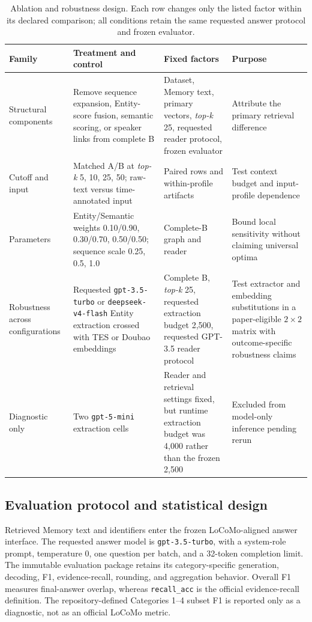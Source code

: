 \documentclass[10pt,twocolumn]{article}
\newcommand{\recallacc}{\texttt{recall\_acc}}
\newcommand{\topk}{\textit{top-k}}
\begin{document}
\begin{table}[!t]
\centering
\caption*{Ablation and robustness design. Each row changes only the listed
factor within its declared comparison; all conditions retain the same
requested answer protocol and frozen evaluator.}
\begin{tabularx}{\textwidth}{@{}p{}p{}Xp{}@{}}
\toprule
Family & Treatment and control & Fixed factors & Purpose \\
\midrule
Structural components & Remove sequence expansion, Entity-score fusion,
semantic scoring, or speaker links from complete B & Dataset, Memory text,
primary vectors, \topk{} 25, requested reader protocol, frozen evaluator & Attribute the primary
retrieval difference \\
Cutoff and input & Matched A/B at \topk{} 5, 10, 25, 50; raw-text versus
time-annotated input & Paired rows and within-profile artifacts & Test context
budget and input-profile dependence \\
Parameters & Entity/Semantic weights 0.10/0.90, 0.30/0.70, 0.50/0.50;
sequence scale 0.25, 0.5, 1.0 & Complete-B graph and reader & Bound local
sensitivity without claiming universal optima \\
Robustness across configurations & Requested \texttt{gpt-3.5-turbo} or
\texttt{deepseek-v4-flash} Entity extraction crossed with TES or Doubao
embeddings & Complete B,
\topk{} 25, requested extraction budget 2,500, requested GPT-3.5 reader protocol & Test extractor and
embedding substitutions in a paper-eligible $2\times2$ matrix with
outcome-specific robustness claims \\
Diagnostic only & Two \texttt{gpt-5-mini} extraction cells & Reader and
retrieval settings fixed, but runtime extraction budget was 4,000 rather than
the frozen 2,500 & Excluded from model-only inference pending rerun \\
\bottomrule
\end{tabularx}
\end{table}

\subsection{Evaluation protocol and statistical design}

Retrieved Memory text and identifiers enter the frozen LoCoMo-aligned answer
interface. The requested answer model is \texttt{gpt-3.5-turbo}, with a
system-role prompt, temperature 0, one question per batch, and a 32-token
completion limit. The immutable evaluation package retains its
category-specific generation, decoding, F1, evidence-recall, rounding, and
aggregation behavior. Overall F1 measures final-answer overlap, whereas
\recallacc{} is the official evidence-recall definition. The
repository-defined Categories 1--4 subset F1 is reported only as a diagnostic,
not as an official LoCoMo metric.
\end{document}
